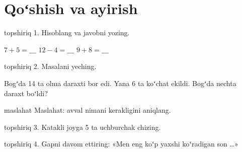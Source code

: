 \documentclass[12pt]{article}
\begin{document}
\section*{Qoʻshish va ayirish}

\begin{uslub}{topshiriq}
1. Hisoblang va javobni yozing.
\end{uslub}
$7 + 5 = \_\_\_$ \qquad $12 - 4 = \_\_\_$ \qquad $9 + 8 = \_\_\_$
\javobjoyi[15mm]

\begin{uslub}{topshiriq}
2. Masalani yeching.
\end{uslub}
Bogʻda 14 ta olma daraxti bor edi. Yana 6 ta koʻchat ekildi.
Bogʻda nechta daraxt boʻldi?
\begin{uslub}{maslahat}
Maslahat: avval nimani  kerakligini aniqlang.
\end{uslub}

\begin{uslub}{topshiriq}
3. Katakli joyga 5 ta uchburchak chizing.
\end{uslub}
\katakjoy[35mm]

\begin{uslub}{topshiriq}
4. Gapni davom ettiring: «Men eng koʻp yaxshi koʻradigan son …»
\end{uslub}
\end{document}
